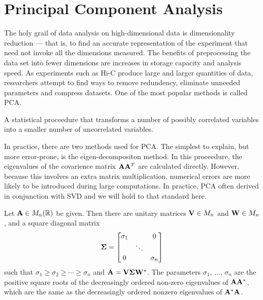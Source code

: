 \section*{Principal Component Analysis}

The holy grail of data analysis on high-dimensional data is dimensionality reduction --- that is, to find an accurate representation of
the experiment that need not invoke all the dimensions measured.  The benefits of preprocessing the data set into fewer dimensions are
increases in storage capacity and analysis speed.  As experiments such as Hi-C produce large and larger quantities of data, researchers
attempt to find ways to remove redundency, eliminate unneeded parameters and compress datasets.  One of the most popular methods is
called \gls{PCA}\cite{law1987}.

\begin{defn}
  A statistical proceedure that transforms a number of possibly correlated variables into a smaller number of uncorrelated variables.
\end{defn}

In practice, there are two methods used for \gls{PCA}.  The simplest to explain, but more error-prone, is the eigen-decompositon
method\cite{}.  In this proceedure, the eigenvalues of the covarience matrix $\mathbf{A}\mathbf{A}^T$ are calculated directly.  However,
because this involves an extra matrix multiplication, numerical errors are more likely to be introduced during large computations.
In practice, \gls{PCA} often derived in conjunction with \gls{SVD} and we will hold to that standard here.

\begin{thm}
  Let $\mathbf{A} \in M_{n}(\mathbb{R})$ be given. Then there are unitary matrices $\mathbf{V} \in M_n$ and $\mathbf{W} \in M_n$, and a square diagonal
  matrix
  \[
    \mathbf{\Sigma} =
      \begin{bmatrix}
        \sigma_1 &        & 0        \\
                 & \ddots &          \\
        0        &        & \sigma_n \\
      \end{bmatrix}
  \]
  such that $\sigma_1 \geq \sigma_2 \geq \cdots \geq \sigma_n$ and $\mathbf{A} = \mathbf{V}\mathbf{\Sigma}\mathbf{W}^*$.  The parameters $\sigma_1$,
  $\hdots$, $\sigma_n$ are the positive square roots of the decreasingly ordered non-zero eigenvalues of $\mathbf{A}\mathbf{A}^*$, which are the
  same as the decreasingly ordered nonzero eigenvalues of $\mathbf{A}^*\mathbf{A}$.

\end{thm}

